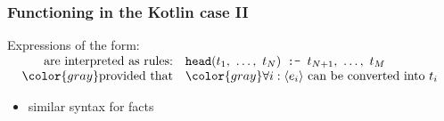 \documentclass[presentation]{beamer}
\begin{document}
\begin{frame}%
\frametitle{Functioning in the Kotlin case II}

    \begin{block}{}
        Expressions of the form:
        $\begin{array}{rl}
            \text{\phantom{expre}are interpreted as rules:} & \mathtt{head}(t_1,\ \ldots,\ t_N) \impliedBy t_{N+1},\ \ldots,\ t_M
            \\\color{gray}
            \text{provided that} &\color{gray} \forall i : \langle e_i \rangle \text{ can be converted into } t_i
        \end{array}$
    \end{block}
    \begin{itemize}
        \item similar syntax for facts
    \end{itemize}

\end{frame}
\end{document}
